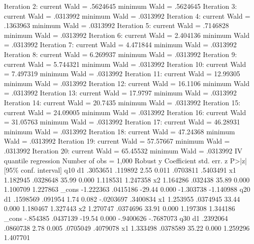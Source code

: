 Iteration     2:  current Wald =  .5624645         minimum Wald =  .5624645
Iteration     3:  current Wald =  .0313992         minimum Wald =  .0313992
Iteration     4:  current Wald =  .1363963         minimum Wald =  .0313992
Iteration     5:  current Wald =  .7146828         minimum Wald =  .0313992
Iteration     6:  current Wald =  2.404136         minimum Wald =  .0313992
Iteration     7:  current Wald =  4.471844         minimum Wald =  .0313992
Iteration     8:  current Wald =  6.269937         minimum Wald =  .0313992
Iteration     9:  current Wald =  5.744321         minimum Wald =  .0313992
Iteration    10:  current Wald =  7.497319         minimum Wald =  .0313992
Iteration    11:  current Wald =  12.99305         minimum Wald =  .0313992
Iteration    12:  current Wald =   16.1106         minimum Wald =  .0313992
Iteration    13:  current Wald =   17.9797         minimum Wald =  .0313992
Iteration    14:  current Wald =   20.7435         minimum Wald =  .0313992
Iteration    15:  current Wald =  24.09005         minimum Wald =  .0313992
Iteration    16:  current Wald =  31.05763         minimum Wald =  .0313992
Iteration    17:  current Wald =  46.28931         minimum Wald =  .0313992
Iteration    18:  current Wald =  47.24368         minimum Wald =  .0313992
Iteration    19:  current Wald =  57.57667         minimum Wald =  .0313992
Iteration    20:  current Wald =  65.45532         minimum Wald =  .0313992
{\smallskip}
IV quantile regression                Number of obs               =      1,000
             {\VBAR}               Robust
           y {\VBAR} Coefficient  std. err.      z    P>|z|     [95\% conf. interval]
q10          {\VBAR}
          d1 {\VBAR}   .3053651    .119892     2.55   0.011     .0703811    .5403491
          x1 {\VBAR}   1.182945   .0328648    35.99   0.000     1.118531    1.247358
          x2 {\VBAR}   1.164286    .032438    35.89   0.000     1.100709    1.227863
       _cons {\VBAR}  -1.222363   .0415186   -29.44   0.000    -1.303738   -1.140988
q20          {\VBAR}
          d1 {\VBAR}   .1598569    .091954     1.74   0.082    -.0203697    .3400834
          x1 {\VBAR}   1.253955   .0374945    33.44   0.000     1.180467    1.327443
          x2 {\VBAR}   1.270747   .0374696    33.91   0.000     1.197308    1.344186
       _cons {\VBAR}   -.854385   .0437139   -19.54   0.000    -.9400626   -.7687073
q30          {\VBAR}
          d1 {\VBAR}   .2392064   .0860738     2.78   0.005     .0705049    .4079078
          x1 {\VBAR}   1.333498   .0378589    35.22   0.000     1.259296    1.407701
